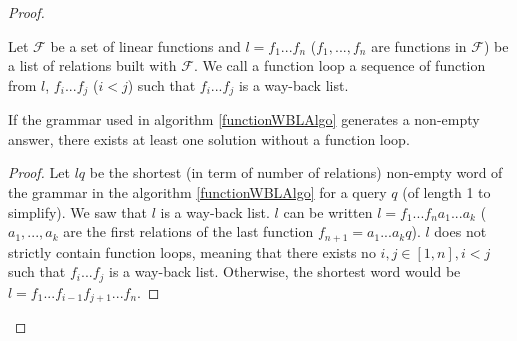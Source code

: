 \documentclass[10pt,a4paper,draft]{article}
\begin{document}
\begin{proof}

\begin{definition}
Let $\mathcal{F}$ be a set of linear functions and $l = f_1 ... f_n$ ($f_1,...,f_n$ are functions in $\mathcal{F}$) be a list of relations built with $\mathcal{F}$. We call a function loop a sequence of function from $l$, $f_i ... f_j$ ($i < j$) such that $f_i ... f_j$ is a way-back list.
\end{definition}

\begin{lemma}
If the grammar used in algorithm \ref{functionWBLAlgo} generates a non-empty answer, there exists at least one solution without a function loop.
\end{lemma}

\begin{proof}

Let $lq$ be the shortest (in term of number of relations) non-empty word of the grammar in the algorithm \ref{functionWBLAlgo} for a query $q$ (of length 1 to simplify). We saw that $l$ is a way-back list. $l$ can be written $l = f_1 ... f_n a_1 ... a_k$ ($a_1,...,a_k$ are the first relations of the last function $f_{n+1} = a_1 ... a_k q$). $l$ does not strictly contain function loops, meaning that there exists no $i,j \in [1, n], i<j$ such that $f_i ... f_j$ is a way-back list. Otherwise, the shortest word would be $l = f_1 ... f_{i-1} f_{j+1} ... f_n$.

\end{proof}






\end{proof}
\end{document}
